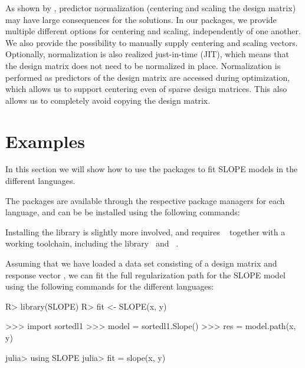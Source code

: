 \documentclass[article]{jss}
\begin{document}
As shown by \citet{larsson2025}, predictor normalization (centering and
scaling the design matrix) may have large consequences for the
solutions. In our packages, we provide multiple different options
for centering and scaling, independently of one another.
We also provide the possibility to manually supply centering
and scaling vectors. Optionally, normalization is also realized just-in-time (JIT),
which means that the design matrix does not need to be normalized in place.
Normalization is performed as predictors of the design matrix are accessed during
optimization, which allows us to support centering even of sparse design
matrices. This also allows us to completely avoid copying the design matrix.

\section{Examples}\label{sec:examples}

In this section we will show how to use the packages to fit SLOPE models in
the different languages.

The packages are
available through the respective package managers for each language, and can be
be installed using the following commands:
\begin{description}[labelwidth=8ex]
  \item[\proglang{R}] 
  \item[\proglang{Python}] 
  \item[\proglang{Julia}] 
\end{description}

Installing the  library is slightly more involved, and requires
~\citep{kitware2025} together with a working  toolchain, including
the  library~\citep{guennebaud2010a} and ~\citep{dagum1998}.

Assuming that we have loaded a data set consisting of a design
matrix  and response vector , we can fit the full regularization
path for the SLOPE model using the following commands for the different languages:

\begin{minipage}[t]{0.25\textwidth}%
  \textbf{}
  \begin{Code}
R> library(SLOPE)
R> fit <- SLOPE(x, y)
  \end{Code}
\end{minipage}
\hfill
\begin{minipage}[t]{0.32\textwidth}

  \textbf{}
  \begin{Code}
>>> import sortedl1
>>> model = sortedl1.Slope()
>>> res = model.path(x, y)
  \end{Code}
\end{minipage}
\hfill
\begin{minipage}[t]{0.32\textwidth}
  \textbf{}
  \begin{Code}
julia> using SLOPE
julia> fit = slope(x, y)
  \end{Code}
\end{minipage}
\end{document}
